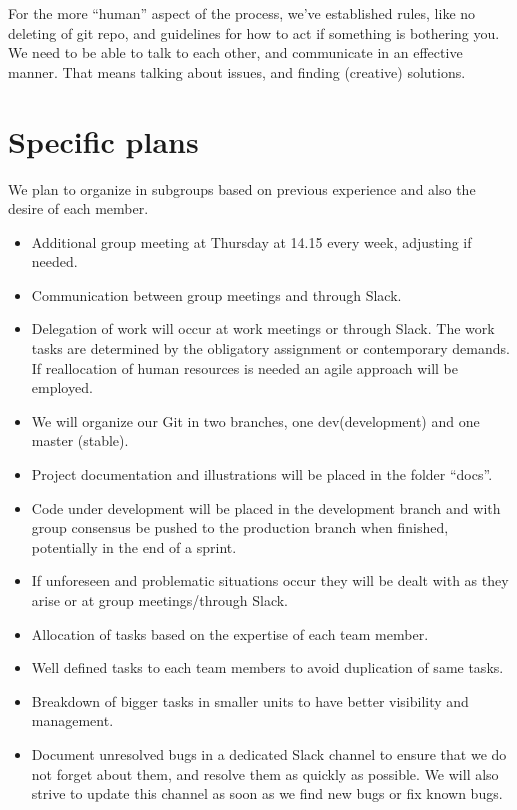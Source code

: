 \documentclass{article}
\begin{document}
For the more “human” aspect of the process, we’ve established rules, like no deleting of git repo, and guidelines for how to act if something is bothering you. We need to be able to talk to each other, and communicate in an effective manner. That means talking about issues, and finding (creative) solutions. 

\section*{Specific plans}
 We plan to organize in subgroups based on previous experience and also the desire of each member.

\begin{itemize}

\item Additional group meeting at Thursday at 14.15 every week, adjusting if needed.
\item Communication between group meetings and through Slack.
\item Delegation of work will occur at work meetings or through Slack. The work tasks are determined by the obligatory assignment or contemporary demands. If reallocation of human resources is needed an agile approach will be employed. 
\item We will organize our Git in two branches, one dev(development) and one master (stable).
\item Project documentation and illustrations will be placed in the folder “docs”. 
\item Code under development will be placed in the development branch and with group consensus be pushed to the production branch when finished, potentially in the end of a sprint.
\item If unforeseen and problematic situations occur they will be dealt with as they arise or at group meetings/through Slack.
\item Allocation of tasks based on the expertise of each team member.
\item Well defined tasks to each team members to avoid duplication of same tasks.
\item Breakdown of bigger tasks in smaller units to have better visibility and management. 
\item Document unresolved bugs in a dedicated Slack channel to ensure that we do not forget about them, and resolve them as quickly as possible. We will also strive to update this channel as soon as we find new bugs or fix known bugs.

\end{itemize}
\end{document}
